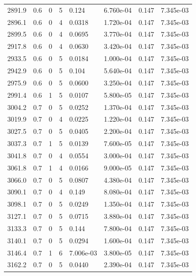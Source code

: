 \documentclass[preview]{standalone}
\begin{document}
{{{{{{{{\begin{tabular}{L{1.2cm}C{1.2cm} C{0.3cm}C{0.5cm} C{1.4cm}C{1.4cm} C{1.4cm}C{1.4cm}}
  2891.9  &   0.6  & 0     &  5 &  0.124  & 6.760e-04  & 0.147 &  7.345e-03   \\ 
  2896.1  &   0.6  & 0     &  4 &  0.0318  & 1.720e-04  & 0.147 &  7.345e-03   \\ 
  2899.5  &   0.6  & 0     &  4 &  0.0695  & 3.770e-04  & 0.147 &  7.345e-03   \\ 
  2917.8  &   0.6  & 0     &  4 &  0.0630  & 3.420e-04  & 0.147 &  7.345e-03   \\ 
  2933.5  &   0.6  & 0     &  5 &  0.0184  & 1.000e-04  & 0.147 &  7.345e-03   \\ 
  2942.9  &   0.6  & 0     &  5 &  0.104  & 5.640e-04  & 0.147 &  7.345e-03   \\ 
  2975.9  &   0.6  & 0     &  5 &  0.0600  & 3.250e-04  & 0.147 &  7.345e-03   \\ 
  2991.4  &   0.6  & 1     &  5 &  0.0107  & 5.800e-05  & 0.147 &  7.345e-03   \\ 
  3004.2  &   0.7  & 0     &  5 &  0.0252  & 1.370e-04  & 0.147 &  7.345e-03   \\ 
  3019.9  &   0.7  & 0     &  4 &  0.0225  & 1.220e-04  & 0.147 &  7.345e-03   \\ 
  3027.5  &   0.7  & 0     &  5 &  0.0405  & 2.200e-04  & 0.147 &  7.345e-03   \\ 
  3037.3  &   0.7  & 1     &  5 &  0.0139  & 7.600e-05  & 0.147 &  7.345e-03   \\ 
  3041.8  &   0.7  & 0     &  4 &  0.0554  & 3.000e-04  & 0.147 &  7.345e-03   \\ 
  3061.8  &   0.7  & 1     &  4 &  0.0166  & 9.000e-05  & 0.147 &  7.345e-03   \\ 
  3066.0  &   0.7  & 0     &  5 &  0.0807  & 4.380e-04  & 0.147 &  7.345e-03   \\ 
  3090.1  &   0.7  & 0     &  4 &  0.149  & 8.080e-04  & 0.147 &  7.345e-03   \\ 
  3098.1  &   0.7  & 0     &  5 &  0.0249  & 1.350e-04  & 0.147 &  7.345e-03   \\ 
  3127.1  &   0.7  & 0     &  5 &  0.0715  & 3.880e-04  & 0.147 &  7.345e-03   \\ 
  3133.3  &   0.7  & 0     &  5 &  0.144  & 7.800e-04  & 0.147 &  7.345e-03   \\ 
  3140.1  &   0.7  & 0     &  5 &  0.0294  & 1.600e-04  & 0.147 &  7.345e-03   \\ 
  3146.4  &   0.7  & 1     &  6 &  7.006e-03  & 3.800e-05  & 0.147 &  7.345e-03   \\ 
  3162.2  &   0.7  & 0     &  5 &  0.0440  & 2.390e-04  & 0.147 &  7.345e-03   \\ 

\end{tabular}}}}}}}}}
\end{document}
